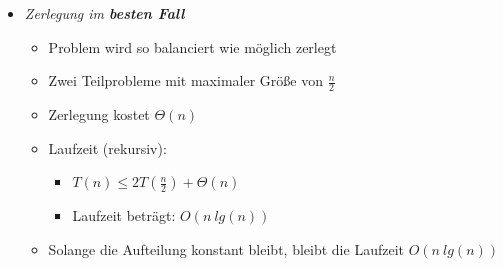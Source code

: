 \begin{itemize}
\begin{itemize}
                \item \textit{Zerlegung im \textbf{besten Fall}}
                    \begin{itemize}
                        \item Problem wird so balanciert wie möglich zerlegt 
                        \item Zwei Teilprobleme mit maximaler Größe von $\frac{n}{2}$
                        \item Zerlegung kostet $\Theta(n)$
                        \item Laufzeit (rekursiv):
                            \begin{itemize}
                                \item $T(n) \leq 2T(\frac{n}{2}) + \Theta(n)$
                                \item Laufzeit beträgt: $O(n~lg(n))$
                            \end{itemize}
                        \item Solange die Aufteilung konstant bleibt, bleibt die Laufzeit $O(n~lg(n))$
                    \end{itemize}
                
            \end{itemize}
    \end{itemize}

